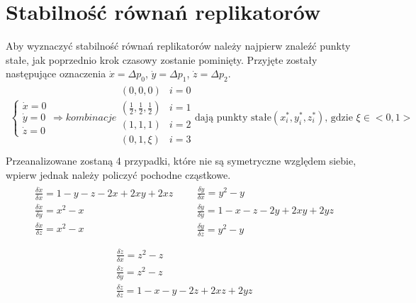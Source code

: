 \section{Stabilność równań replikatorów}
\label{sec:stab_repl}
Aby wyznaczyć stabilność równań replikatorów należy najpierw znaleźć punkty stałe, jak poprzednio krok czasowy zostanie pominięty.  Przyjęte zostały następujące oznaczenia $\dot{x} = \Delta p_0$, $\dot{y} = \Delta p_1$, $\dot{z} = \Delta p_2$.
\begin{align*}
\left\{
\begin{array}{l}
\dot{x} = 0 \\
\dot{y} = 0 \\
\dot{z} = 0 
\end{array}
\right.
\Rightarrow kombinacje
\begin{array}{ll}
(0,0,0)  & i=0 \\
(\frac{1}{2},\frac{1}{2},\frac{1}{2}) & i=1 \\
(1,1,1) & i=2 \\
(0,1,\xi) & i=3 \\ 
\end{array}
\text{dają punkty stałe} (x^*_i, y^*_i, z^*_i)\text{, gdzie }\xi \in <0,1>
\end{align*}
Przeanalizowane zostaną 4 przypadki, które nie są symetryczne względem siebie, wpierw  jednak należy policzyć pochodne cząstkowe.
\begin{align*}
\begin{array}{l}
\frac{\delta \dot{x}}{\delta x} = 1-y-z-2x+2xy+2xz\\
\frac{\delta \dot{x}}{\delta y} = x^2 - x\\
\frac{\delta \dot{x}}{\delta z} = x^2 - x\\
\end{array}
&&
\begin{array}{l}
\frac{\delta \dot{y}}{\delta x} = y^2 - y\\
\frac{\delta \dot{y}}{\delta y} = 1-x-z-2y+2xy+2yz\\
\frac{\delta \dot{y}}{\delta z} = y^2 - y\\
\end{array}
\end{align*}
\begin{align*}
\begin{array}{l}
\frac{\delta \dot{z}}{\delta x} = z^2 - z\\
\frac{\delta \dot{z}}{\delta y} = z^2 - z\\
\frac{\delta \dot{z}}{\delta z} = 1-x-y-2z+2xz+2yz\\
\end{array}
\end{align*}
